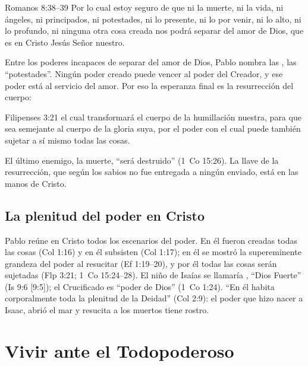 \begin{verso}{Romanos 8:38–39}
Por lo cual estoy seguro de que ni la muerte, ni la vida, ni ángeles, ni principados, ni potestades, ni lo presente, ni lo por venir, ni lo alto, ni lo profundo, ni ninguna otra cosa creada nos podrá separar del amor de Dios, que es en Cristo Jesús Señor nuestro.
\end{verso}

Entre los poderes incapaces de separar del amor de Dios, Pablo nombra las , las ``potestades''. Ningún poder creado puede vencer al poder del Creador, y ese poder está al servicio del amor. Por eso la esperanza final es la resurrección del cuerpo:

\begin{verso}{Filipenses 3:21}
el cual transformará el cuerpo de la humillación nuestra, para que sea semejante al cuerpo de la gloria suya, por el poder con el cual puede también sujetar a sí mismo todas las cosas.
\end{verso}

El último enemigo, la muerte, ``será destruido'' (1~Co 15:26). La llave de la resurrección, que según los sabios no fue entregada a ningún enviado, está en las manos de Cristo.

\subsection{La plenitud del poder en Cristo}

Pablo reúne en Cristo todos los escenarios del poder. En él fueron creadas todas las cosas (Col 1:16) y en él subsisten (Col 1:17); en él se mostró la supereminente grandeza del poder al resucitar (Ef 1:19--20), y por él todas las cosas serán sujetadas (Flp 3:21; 1~Co 15:24--28). El niño de Isaías se llamaría , ``Dios Fuerte'' (Is 9:6 [9:5]); el Crucificado es ``poder de Dios'' (1~Co 1:24). ``En él habita corporalmente toda la plenitud de la Deidad'' (Col 2:9): el poder que hizo nacer a Isaac, abrió el mar y resucita a los muertos tiene rostro.


\section{Vivir ante el Todopoderoso}

